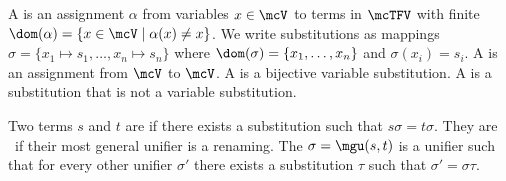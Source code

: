 \begin{definition}\label{def:substitution}
A  is an assignment $\alpha$ from variables $x\in\mcV$ to terms in $\mcTFV$
with finite  $\dom(\alpha) = \{ x\in\mcV\mid\alpha(x) \neq x \}$.
We write substitutions as mappings $\sigma=\{ x_1\mapsto s_1,\ldots,x_n\mapsto s_n \}$
where $\dom(\sigma)=\{ x_1,\ldots,x_n \}$ and $\sigma(x_i)=s_i$.
A  is an assignment from $\mcV$ to $\mcV$.
A  is a bijective variable substitution.
A  is a substitution that is not a variable substitution.
\end{definition}
\begin{definition}\label{def:unifier}
Two terms $s$ and $t$ are  if there exists a substitution such that $s\sigma=t\sigma$.
They are  if their most general unifier is a renaming.
The  $\sigma=\mgu(s,t)$ is a unifier such that
for every other unifier $\sigma'$ there exists a substitution $\tau$ such that
$\sigma' = \sigma \tau$.
\end{definition}
